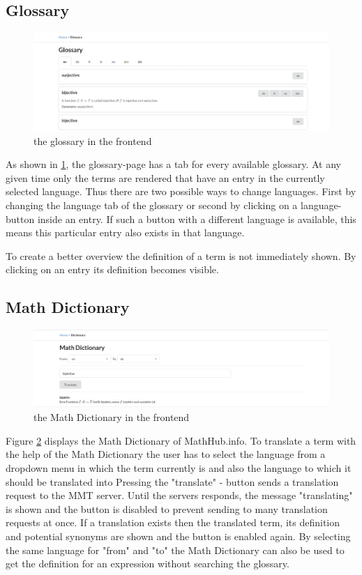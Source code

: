 \documentclass[11pt,a4paper]{article}
\begin{document}
\subsection{Glossary} \label{gloss}
\begin{figure}[H]
\includegraphics[width=1\textwidth]{glossary.png}
\caption{the glossary in the frontend}
\label{fig:glossary}
\end{figure}
As shown in \ref{fig:glossary}, the glossary-page has a tab for every available glossary.
At any given time only the terms are rendered that have an entry in the currently selected language.
Thus there are two possible ways to change languages.
First by changing the language tab of the glossary or second by clicking on a language-button inside an entry.
If such a button with a different language is available, this means this particular entry also exists in that language.

To create a better overview the definition of a term is not immediately shown.
By clicking on an entry its definition becomes visible.

\subsection{Math Dictionary}
\begin{figure}[H]
\includegraphics[width=1\textwidth]{dictionary.png}
\caption{the Math Dictionary in the frontend}
\label{fig:dict}
\end{figure}
Figure \ref{fig:dict} displays the Math Dictionary of MathHub.info.
To translate a term with the help of the Math Dictionary the user has to select the language from a dropdown menu in which the term currently is and also the language to which it should be translated into
Pressing the "translate" - button sends a translation request to the MMT server.
Until the servers responds, the message "translating" is shown and the button is disabled to prevent sending to many translation requests at once.
If a translation exists then the translated term, its definition and potential synonyms are shown and the button is enabled again.
By selecting the same language for "from" and "to" the Math Dictionary can also be used to get the definition for an expression without searching the glossary.
\end{document}
